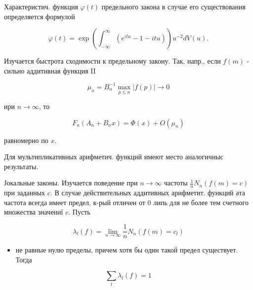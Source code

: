 \documentclass[10pt]{article}
\begin{document}
Характеристич. функция $\varphi(t)$ предельного закона в случае его существования определяется формулой



\[

\varphi(t)=\exp \left(\int_{-\infty}^{\infty}\left(e^{i t u}-1-i t u\right)\right) u^{-2} d V(u) .

\]



Изучается быстрота сходимости к предельному закону. Так, напр., если $f(m)$ - сильно аддитивная функция II



\[

\mu_{n}=B_{n}^{-1} \max _{p \leqslant n}|f(p)| \rightarrow 0

\]



ири $n \rightarrow \infty$, то



\[

F_{n}\left(A_{n}+B_{n} x\right)=\Phi(x)+O\left(\mu_{n}\right)

\]



равномерно по $x$.



Для мультипликативных арифметич. функций имеют место аналогичныс результаты.



Јокальные законы. Изучается поведение при $n \rightarrow \infty$ частоты $\frac{1}{n} N_{n}(f(m)=c)$ при заданных $c$. В случае действительных аддитивных арифметит. функций әта частота всегда имеет предел, к-рый отличен от 0 липь для не более тем счетного множества значениї $c$. Пусть



\[

\lambda_{l}(f)=\lim _{n \rightarrow \infty} \frac{1}{n} N_{n}\left(f(m)=c_{l}\right)

\]



\begin{itemize}

  \item не равные нулю пределы, причем хотя бы один такой предел существует. Тогда

\end{itemize}



\[

\sum_{l} \lambda_{l}(f)=1

\]
\end{document}
